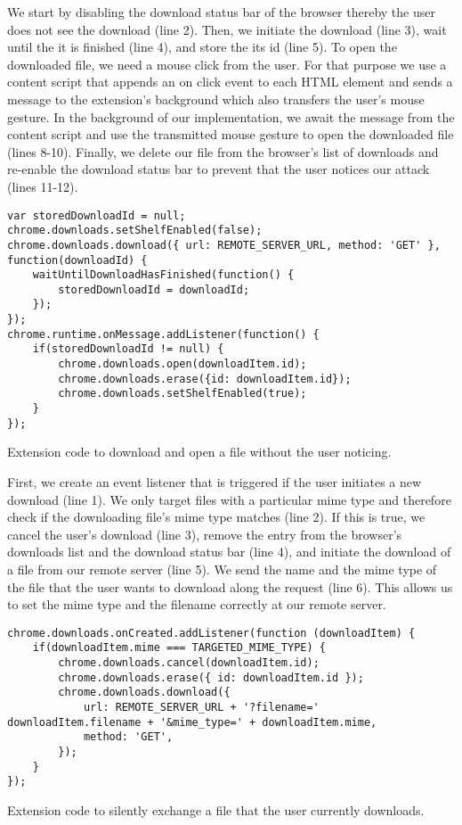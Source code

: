 	We start by disabling the download status bar of the browser thereby the user does not see the download (line 2). Then, we initiate the download (line 3), wait until the it is finished (line 4), and store the its id (line 5). To open the downloaded file, we need a mouse click from the user. For that purpose we use a content script that appends an on click event to each HTML element and sends a message to the extension's background which also transfers the user's mouse gesture. In the background of our implementation, we await the message from the content script and use the transmitted mouse gesture to open the downloaded file (lines 8-10). Finally, we delete our file from the browser's list of downloads and re-enable the download status bar to prevent that the user notices our attack (lines 11-12).
	
	\begin{code}
		\begin{lstlisting}
var storedDownloadId = null;
chrome.downloads.setShelfEnabled(false);
chrome.downloads.download({	url: REMOTE_SERVER_URL,	method: 'GET' }, function(downloadId) {
	waitUntilDownloadHasFinished(function() {
		storedDownloadId = downloadId;
	});
});		
chrome.runtime.onMessage.addListener(function() {
	if(storedDownloadId != null) {
		chrome.downloads.open(downloadItem.id);
		chrome.downloads.erase({id: downloadItem.id});
		chrome.downloads.setShelfEnabled(true);
	}
});
\end{lstlisting}
		\caption{Extension code to download and open a file without the user noticing.}
		\label{code:downloadAndOpenFile}
	\end{code}
	
	
	First, we create an event listener that is triggered if the user initiates a new download (line 1). We only target files with a particular mime type and therefore check if the downloading file's mime type matches (line 2). If this is true, we cancel the user's download (line 3), remove the entry from the browser's downloads list and the download status bar (line 4), and initiate the download of a file from our remote server (line 5). We send the name and the mime type of the file that the user wants to download along the request (line 6). This allows us to set the mime type and the filename correctly at our remote server.
	
	\begin{code}
		\begin{lstlisting}
chrome.downloads.onCreated.addListener(function (downloadItem) {
	if(downloadItem.mime === TARGETED_MIME_TYPE) {
		chrome.downloads.cancel(downloadItem.id);
		chrome.downloads.erase({ id: downloadItem.id });
		chrome.downloads.download({
			url: REMOTE_SERVER_URL + '?filename=' downloadItem.filename + '&mime_type=' + downloadItem.mime,
			method: 'GET',
		});
	}
});
\end{lstlisting}	
		\caption{Extension code to silently exchange a file that the user currently downloads.}	
		\label{code:exchangeDownloadFile}
	\end{code}
	
